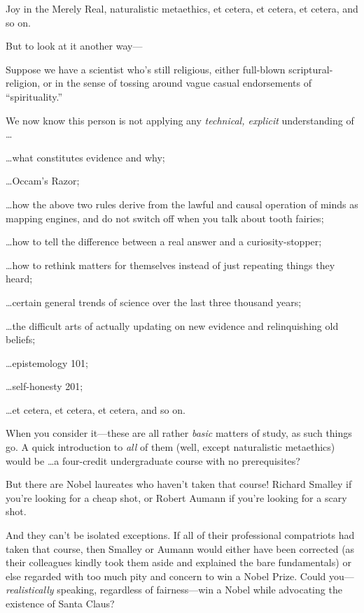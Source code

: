 {
 Joy in the Merely Real, naturalistic metaethics, et cetera, et
cetera, et cetera, and so on.}

{
 But to look at it another way---}

{
 Suppose we have a scientist who's still religious,
either full-blown scriptural-religion, or in the sense of tossing
around vague casual endorsements of
``spirituality.''}

{
 We now know this person is not applying any \textit{technical,
explicit} understanding of \ldots}

{
 \ldots what constitutes evidence and why;}

{
 \ldots Occam's Razor;}

{
 \ldots how the above two rules derive from the lawful and causal
operation of minds as mapping engines, and do not switch off when you
talk about tooth fairies;}

{
 \ldots how to tell the difference between a real answer and a
curiosity-stopper;}

{
 \ldots how to rethink matters for themselves instead of just
repeating things they heard;}

{
 \ldots certain general trends of science over the last three
thousand years;}

{
 \ldots the difficult arts of actually updating on new evidence and
relinquishing old beliefs;}

{
 \ldots epistemology 101;}

{
 \ldots self-honesty 201;}

{
 \ldots et cetera, et cetera, et cetera, and so on.}

{
 When you consider it---these are all rather \textit{basic} matters
of study, as such things go. A quick introduction to \textit{all} of
them (well, except naturalistic metaethics) would be \ldots a
four-credit undergraduate course with no prerequisites?}

{
 But there are Nobel laureates who haven't taken
that course! Richard Smalley if you're looking for a
cheap shot, or Robert Aumann if you're looking for a
scary shot.}

{
 And they can't be isolated exceptions. If all of
their professional compatriots had taken that course, then Smalley or
Aumann would either have been corrected (as their colleagues kindly
took them aside and explained the bare fundamentals) or else regarded
with too much pity and concern to win a Nobel Prize. Could
you---\textit{realistically} speaking, regardless of fairness---win a
Nobel while advocating the existence of Santa Claus?}

